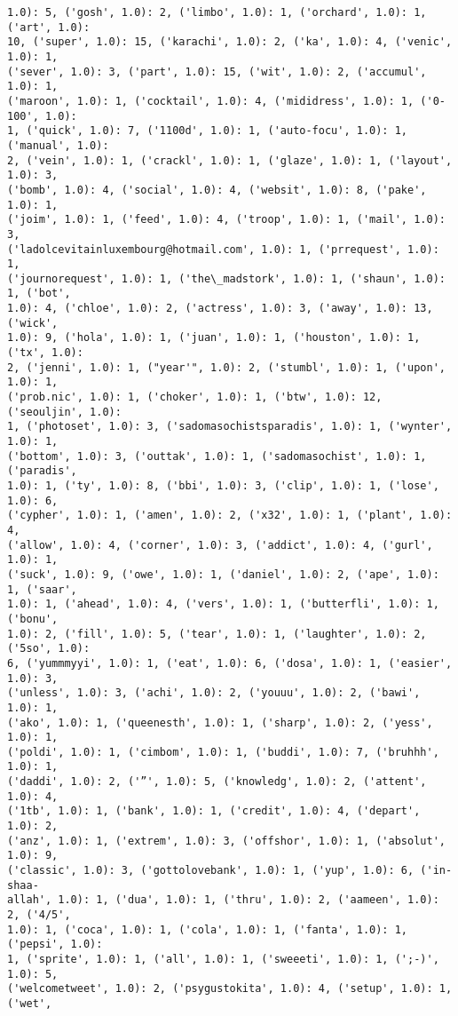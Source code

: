 \documentclass[11pt]{article}
\begin{document}
\begin{Verbatim}[commandchars=\\\{\}]
1.0): 5, ('gosh', 1.0): 2, ('limbo', 1.0): 1, ('orchard', 1.0): 1, ('art', 1.0):
10, ('super', 1.0): 15, ('karachi', 1.0): 2, ('ka', 1.0): 4, ('venic', 1.0): 1,
('sever', 1.0): 3, ('part', 1.0): 15, ('wit', 1.0): 2, ('accumul', 1.0): 1,
('maroon', 1.0): 1, ('cocktail', 1.0): 4, ('mididress', 1.0): 1, ('0-100', 1.0):
1, ('quick', 1.0): 7, ('1100d', 1.0): 1, ('auto-focu', 1.0): 1, ('manual', 1.0):
2, ('vein', 1.0): 1, ('crackl', 1.0): 1, ('glaze', 1.0): 1, ('layout', 1.0): 3,
('bomb', 1.0): 4, ('social', 1.0): 4, ('websit', 1.0): 8, ('pake', 1.0): 1,
('joim', 1.0): 1, ('feed', 1.0): 4, ('troop', 1.0): 1, ('mail', 1.0): 3,
('ladolcevitainluxembourg@hotmail.com', 1.0): 1, ('prrequest', 1.0): 1,
('journorequest', 1.0): 1, ('the\_madstork', 1.0): 1, ('shaun', 1.0): 1, ('bot',
1.0): 4, ('chloe', 1.0): 2, ('actress', 1.0): 3, ('away', 1.0): 13, ('wick',
1.0): 9, ('hola', 1.0): 1, ('juan', 1.0): 1, ('houston', 1.0): 1, ('tx', 1.0):
2, ('jenni', 1.0): 1, ("year'", 1.0): 2, ('stumbl', 1.0): 1, ('upon', 1.0): 1,
('prob.nic', 1.0): 1, ('choker', 1.0): 1, ('btw', 1.0): 12, ('seouljin', 1.0):
1, ('photoset', 1.0): 3, ('sadomasochistsparadis', 1.0): 1, ('wynter', 1.0): 1,
('bottom', 1.0): 3, ('outtak', 1.0): 1, ('sadomasochist', 1.0): 1, ('paradis',
1.0): 1, ('ty', 1.0): 8, ('bbi', 1.0): 3, ('clip', 1.0): 1, ('lose', 1.0): 6,
('cypher', 1.0): 1, ('amen', 1.0): 2, ('x32', 1.0): 1, ('plant', 1.0): 4,
('allow', 1.0): 4, ('corner', 1.0): 3, ('addict', 1.0): 4, ('gurl', 1.0): 1,
('suck', 1.0): 9, ('owe', 1.0): 1, ('daniel', 1.0): 2, ('ape', 1.0): 1, ('saar',
1.0): 1, ('ahead', 1.0): 4, ('vers', 1.0): 1, ('butterfli', 1.0): 1, ('bonu',
1.0): 2, ('fill', 1.0): 5, ('tear', 1.0): 1, ('laughter', 1.0): 2, ('5so', 1.0):
6, ('yummmyyi', 1.0): 1, ('eat', 1.0): 6, ('dosa', 1.0): 1, ('easier', 1.0): 3,
('unless', 1.0): 3, ('achi', 1.0): 2, ('youuu', 1.0): 2, ('bawi', 1.0): 1,
('ako', 1.0): 1, ('queenesth', 1.0): 1, ('sharp', 1.0): 2, ('yess', 1.0): 1,
('poldi', 1.0): 1, ('cimbom', 1.0): 1, ('buddi', 1.0): 7, ('bruhhh', 1.0): 1,
('daddi', 1.0): 2, ('”', 1.0): 5, ('knowledg', 1.0): 2, ('attent', 1.0): 4,
('1tb', 1.0): 1, ('bank', 1.0): 1, ('credit', 1.0): 4, ('depart', 1.0): 2,
('anz', 1.0): 1, ('extrem', 1.0): 3, ('offshor', 1.0): 1, ('absolut', 1.0): 9,
('classic', 1.0): 3, ('gottolovebank', 1.0): 1, ('yup', 1.0): 6, ('in-shaa-
allah', 1.0): 1, ('dua', 1.0): 1, ('thru', 1.0): 2, ('aameen', 1.0): 2, ('4/5',
1.0): 1, ('coca', 1.0): 1, ('cola', 1.0): 1, ('fanta', 1.0): 1, ('pepsi', 1.0):
1, ('sprite', 1.0): 1, ('all', 1.0): 1, ('sweeeti', 1.0): 1, (';-)', 1.0): 5,
('welcometweet', 1.0): 2, ('psygustokita', 1.0): 4, ('setup', 1.0): 1, ('wet',

\end{Verbatim}
\end{document}
